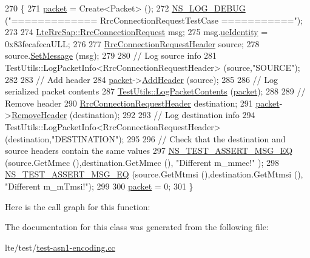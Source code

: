 \begin{DoxyCode}
270 \{
271   \hyperlink{classRrcHeaderTestCase_a6f0748c0e845f797497fbda1ca781803}{packet} = Create<Packet> ();
272   \hyperlink{group__logging_ga413f1886406d49f59a6a0a89b77b4d0a}{NS\_LOG\_DEBUG} (\textcolor{stringliteral}{"============= RrcConnectionRequestTestCase ==========="});
273 
274   \hyperlink{structns3_1_1LteRrcSap_1_1RrcConnectionRequest}{LteRrcSap::RrcConnectionRequest} msg;
275   msg.\hyperlink{structns3_1_1LteRrcSap_1_1RrcConnectionRequest_ad6475f1d8216fa091d0f42866197eee5}{ueIdentity} = 0x83fecafecaULL;
276 
277   \hyperlink{classns3_1_1RrcConnectionRequestHeader}{RrcConnectionRequestHeader} source;
278   source.\hyperlink{classns3_1_1RrcConnectionRequestHeader_a63ed46e57bfb9d0c2ddf74b85ce0d8fe}{SetMessage} (msg);
279 
280   \textcolor{comment}{// Log source info}
281   TestUtils::LogPacketInfo<RrcConnectionRequestHeader> (source,\textcolor{stringliteral}{"SOURCE"});
282 
283   \textcolor{comment}{// Add header}
284   \hyperlink{classRrcHeaderTestCase_a6f0748c0e845f797497fbda1ca781803}{packet}->\hyperlink{classns3_1_1Packet_a465108c595a0bc592095cbcab1832ed8}{AddHeader} (source);
285 
286   \textcolor{comment}{// Log serialized packet contents}
287   \hyperlink{classTestUtils_a9391dac3282094e6e57c0052d88a086f}{TestUtils::LogPacketContents} (\hyperlink{classRrcHeaderTestCase_a6f0748c0e845f797497fbda1ca781803}{packet});
288 
289   \textcolor{comment}{// Remove header}
290   \hyperlink{classns3_1_1RrcConnectionRequestHeader}{RrcConnectionRequestHeader} destination;
291   \hyperlink{classRrcHeaderTestCase_a6f0748c0e845f797497fbda1ca781803}{packet}->\hyperlink{classns3_1_1Packet_a0961eccf975d75f902d40956c93ba63e}{RemoveHeader} (destination);
292 
293   \textcolor{comment}{// Log destination info}
294   TestUtils::LogPacketInfo<RrcConnectionRequestHeader> (destination,\textcolor{stringliteral}{"DESTINATION"});
295 
296   \textcolor{comment}{// Check that the destination and source headers contain the same values}
297   \hyperlink{group__testing_ga2a9d78cffb3db8e867c35fff0b698cf5}{NS\_TEST\_ASSERT\_MSG\_EQ} (source.GetMmec (),destination.GetMmec (), \textcolor{stringliteral}{"Different m\_mmec!"}
      );
298   \hyperlink{group__testing_ga2a9d78cffb3db8e867c35fff0b698cf5}{NS\_TEST\_ASSERT\_MSG\_EQ} (source.GetMtmsi (),destination.GetMtmsi (), \textcolor{stringliteral}{"Different
       m\_mTmsi!"});
299 
300   \hyperlink{classRrcHeaderTestCase_a6f0748c0e845f797497fbda1ca781803}{packet} = 0;
301 \}
\end{DoxyCode}


Here is the call graph for this function\+:




The documentation for this class was generated from the following file\+:\begin{DoxyCompactItemize}
\item 
lte/test/\hyperlink{test-asn1-encoding_8cc}{test-\/asn1-\/encoding.\+cc}\end{DoxyCompactItemize}
